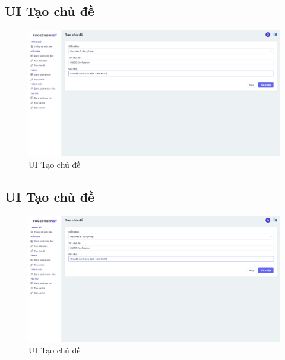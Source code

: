 \documentclass[../index.tex]{subfiles}
\begin{document}
    \subsection{UI Tạo chủ đề}
    \begin{figure}[H]
        \centering
        \includegraphics[width=1\linewidth]{figures/demo/management-topic-create-page.png}
        \caption{UI Tạo chủ đề}
    \end{figure}

    \subsection{UI Tạo chủ đề}
    \begin{figure}[H]
        \centering
        \includegraphics[width=1\linewidth]{figures/demo/management-topic-create-page.png}
        \caption{UI Tạo chủ đề}
    \end{figure}
\end{document}
